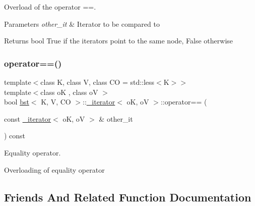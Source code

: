 Overload of the operator ==. 


\begin{DoxyParams}{Parameters}
{\em other\+\_\+it} & Iterator to be compared to \\
\hline
\end{DoxyParams}
\begin{DoxyReturn}{Returns}
bool True if the iterators point to the same node, False otherwise 
\end{DoxyReturn}
\mbox{\label{classbst_1_1__iterator_a2faf29cee0b7d5e2ce002b5c9ae4070b}} 
\subsubsection{\texorpdfstring{operator==()}{operator==()}\hspace{0.1cm}{\footnotesize\ttfamily [2/2]}}
{\footnotesize\ttfamily template$<$class K, class V, class CO = std\+::less$<$\+K$>$$>$ \\
template$<$class oK , class oV $>$ \\
bool \hyperlink{classbst}{bst}$<$ K, V, CO $>$\+::\hyperlink{classbst_1_1__iterator}{\+\_\+iterator}$<$ oK, oV $>$\+::operator== (\begin{DoxyParamCaption}\item[{const \hyperlink{classbst_1_1__iterator}{\+\_\+iterator}$<$ oK, oV $>$ \&}]{other\+\_\+it }\end{DoxyParamCaption}) const\hspace{0.3cm}{\ttfamily [inline]}}



Equality operator. 

Overloading of equality operator 

\subsection{Friends And Related Function Documentation}
\mbox{\label{classbst_1_1__iterator_a517e7799c21cf88ce23e54c7f3f3896f}} 
